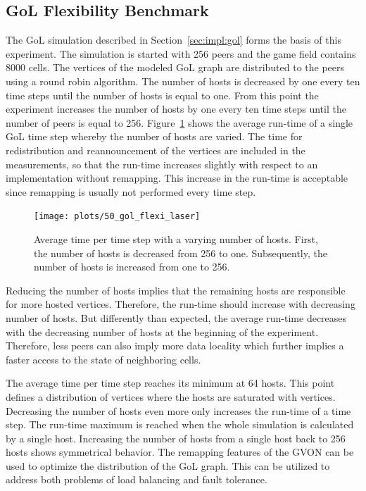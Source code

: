 \subsection{GoL Flexibility Benchmark}

The GoL simulation described in Section~\ref{sec:impl:gol} forms the
basis of this experiment.  The simulation is started with 256 peers
and the game field contains 8000 cells. The vertices of the modeled
GoL graph are distributed to the peers using a round robin algorithm.
The number of hosts is decreased by one every ten time steps until the
number of hosts is equal to one. From this point the experiment
increases the number of hosts by one every ten time steps until the
number of peers is equal to 256. Figure~\ref{fig:gol_flexi_laser}
shows the average run-time of a single GoL time step whereby the
number of hosts are varied. The time for redistribution and
reannouncement of the vertices are included in the measurements, so
that the run-time increases slightly with respect to an implementation
without remapping. This increase in the run-time is acceptable since
remapping is usually not performed every time step.

\begin{figure}[H]
  \texttt{[image: plots/50\_gol\_flexi\_laser]}
  \caption{Average time per time step with a varying number of
    hosts. First, the number of hosts is decreased from 256 to
    one. Subsequently, the number of hosts is increased from one to 256.}
  \label{fig:gol_flexi_laser}
\end{figure}

\noindent Reducing the number of hosts implies that the remaining hosts are
responsible for more hosted vertices. Therefore, the run-time should increase
with decreasing number of hosts.  But differently than expected, the
average run-time decreases with the decreasing number of hosts at the
beginning of the experiment. Therefore, less peers can also imply more
data locality which further implies a faster access to the state of
neighboring cells.

The average time per time step reaches its minimum at 64 hosts. This
point defines a distribution of vertices where the hosts are saturated
with vertices.  Decreasing the number of hosts even more only
increases the run-time of a time step. The run-time maximum is reached
when the whole simulation is calculated by a single host.  Increasing
the number of hosts from a single host back to 256 hosts shows
symmetrical behavior. The remapping features of the GVON can be used
to optimize the distribution of the GoL graph. This can be utilized
to address both problems of load balancing and fault tolerance.

